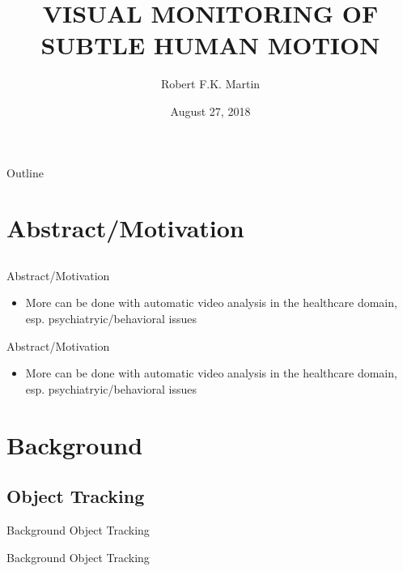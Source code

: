 \documentclass{beamer}
\title[]{VISUAL MONITORING OF SUBTLE HUMAN MOTION}
\author{Robert F.K. Martin}
\institute{Department of Computer Science \\ University of Minnesota}
\date{August 27, 2018}
\begin{document}
%
%
\begin{frame}
  \titlepage
\end{frame}

%
%
\begin{frame}{Outline}
\end{frame}
\section{Abstract/Motivation}
\subsection{}
%
\begin{frame}{Abstract/Motivation}
\begin{itemize}
	\item More can be done with automatic video analysis in the healthcare domain, esp. psychiatryic/behavioral issues
\end{itemize}
\end{frame}
\begin{frame}{Abstract/Motivation}
\begin{itemize}
	\item More can be done with automatic video analysis in the healthcare domain, esp. psychiatryic/behavioral issues
\end{itemize}
\end{frame}
\section{Background}
\subsection{Object Tracking}
%
\begin{frame}{Background}
Object Tracking
\end{frame}
%
\begin{frame}{Background}
Object Tracking
\end{frame}
\end{document}
